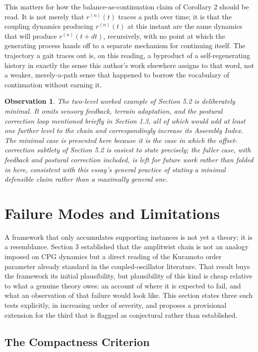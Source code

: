\documentclass[12pt]{article}
\newtheorem{observation}{Observation}
\begin{document}
This matters for how the balance-as-continuation claim of Corollary 2 should be read. It is not merely that $r^{(n)}(t)$ traces a path over time; it is that the coupling dynamics producing $r^{(n)}(t)$ at this instant are the same dynamics that will produce $r^{(n)}(t+dt)$, recursively, with no point at which the generating process hands off to a separate mechanism for continuing itself. The trajectory a gait traces out is, on this reading, a byproduct of a self-regenerating history in exactly the sense this author's work elsewhere assigns to that word, not a weaker, merely-a-path sense that happened to borrow the vocabulary of continuation without earning it.

\begin{observation}
The two-level worked example of Section 5.2 is deliberately minimal. It omits sensory feedback, terrain adaptation, and the postural correction loop mentioned briefly in Section 1.3, all of which would add at least one further level to the chain and correspondingly increase its Assembly Index. The minimal case is presented here because it is the case in which the offset-correction subtlety of Section 5.2 is easiest to state precisely; the fuller case, with feedback and postural correction included, is left for future work rather than folded in here, consistent with this essay's general practice of stating a minimal defensible claim rather than a maximally general one.
\end{observation}

\section{Failure Modes and Limitations}

A framework that only accumulates supporting instances is not yet a theory; it is a resemblance. Section 3 established that the amplitwist chain is not an analogy imposed on CPG dynamics but a direct reading of the Kuramoto order parameter already standard in the coupled-oscillator literature. That result buys the framework its initial plausibility, but plausibility of this kind is cheap relative to what a genuine theory owes: an account of where it is expected to fail, and what an observation of that failure would look like. This section states three such tests explicitly, in increasing order of severity, and proposes a provisional extension for the third that is flagged as conjectural rather than established.

\subsection{The Compactness Criterion}
\end{document}
